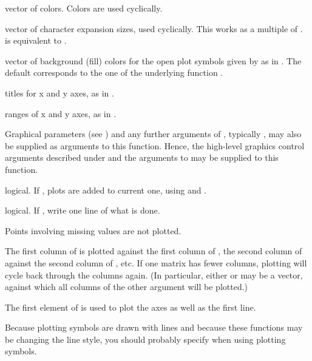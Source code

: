 \begin{Arguments}
\begin{ldescription}
\item[\code{col}] vector of colors.  Colors are used cyclically.
\item[\code{cex}] vector of character expansion sizes, used cyclically.
This works as a multiple of .   is
equivalent to . 
\item[\code{bg}] vector of background (fill) colors for the open plot
symbols given by  as in .  The
default  corresponds to the one of the underlying function
.
\item[\code{xlab, ylab}] titles for x and y axes, as in .
\item[\code{xlim, ylim}] ranges of x and y axes, as in .
\item[\code{...}] Graphical parameters (see ) and any further
arguments of , typically , may also be
supplied as arguments to this function.  Hence, the high-level
graphics control arguments described under  and the
arguments to  may be supplied to this function.
\item[\code{add}] logical.  If , plots are added to current one,
using  and .
\item[\code{verbose}] logical.  If , write one line of what is
done.
\end{ldescription}
\end{Arguments}
%
\begin{Details}\relax
Points involving missing values are not plotted.

The first column of  is plotted against the first column of
, the second column of  against the second column of
, etc.  If one matrix has fewer columns, plotting will cycle
back through the columns again.  (In particular, either  or
 may be a vector, against which all columns of the other
argument will be plotted.)

The first element of  is used to plot the axes
as well as the first line.

Because plotting symbols are drawn with lines and because these
functions may be changing the line style, you should probably specify
 when using plotting symbols.
\end{Details}
